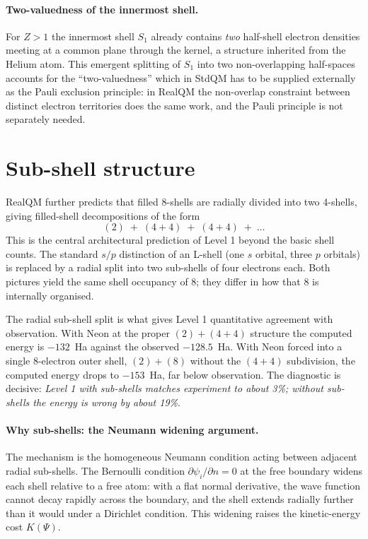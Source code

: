 \paragraph{Two-valuedness of the innermost shell.}
For $Z > 1$ the innermost shell $S_1$ already contains \emph{two} half-shell electron densities meeting at a common plane through the kernel, a structure inherited from the Helium atom. This emergent splitting of $S_1$ into two non-overlapping half-spaces accounts for the ``two-valuedness'' which in StdQM has to be supplied externally as the Pauli exclusion principle: in RealQM the non-overlap constraint between distinct electron territories does the same work, and the Pauli principle is not separately needed.

\section{Sub-shell structure}\label{sec:subshells}

RealQM further predicts that filled 8-shells are radially divided into two 4-shells, giving filled-shell decompositions of the form
\[
(2) \;+\; (4{+}4) \;+\; (4{+}4) \;+\; \ldots
\]
This is the central architectural prediction of Level 1 beyond the basic shell counts. The standard $s/p$ distinction of an L-shell (one $s$ orbital, three $p$ orbitals) is replaced by a radial split into two sub-shells of four electrons each. Both pictures yield the same shell occupancy of 8; they differ in how that 8 is internally organised.

The radial sub-shell split is what gives Level 1 quantitative agreement with observation. With Neon at the proper $(2) + (4{+}4)$ structure the computed energy is $-132$~Ha against the observed $-128.5$~Ha. With Neon forced into a single 8-electron outer shell, $(2) + (8)$ without the $(4{+}4)$ subdivision, the computed energy drops to $-153$~Ha, far below observation. The diagnostic is decisive: \emph{Level 1 with sub-shells matches experiment to about 3\%; without sub-shells the energy is wrong by about 19\%}.

\paragraph{Why sub-shells: the Neumann widening argument.}
The mechanism is the homogeneous Neumann condition acting between adjacent radial sub-shells. The Bernoulli condition $\partial\psi_i / \partial n = 0$ at the free boundary widens each shell relative to a free atom: with a flat normal derivative, the wave function cannot decay rapidly across the boundary, and the shell extends radially further than it would under a Dirichlet condition. This widening raises the kinetic-energy cost $K(\Psi)$.

